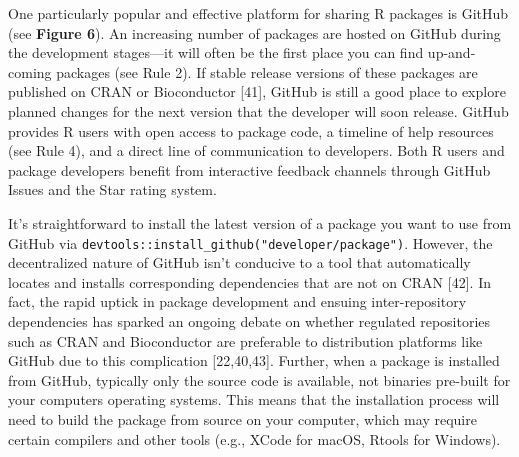 \documentclass[10pt,letterpaper]{article}
\begin{document}
One particularly popular and effective platform for sharing R packages
is GitHub (see \textbf{Figure 6}). An increasing number of packages are
hosted on GitHub during the development stages---it will often be the
first place you can find up-and-coming packages (see Rule 2). If stable
release versions of these packages are published on CRAN or Bioconductor
{[}41{]}, GitHub is still a good place to explore planned changes for
the next version that the developer will soon release. GitHub provides R
users with open access to package code, a timeline of help resources
(see Rule 4), and a direct line of communication to developers. Both R
users and package developers benefit from interactive feedback channels
through GitHub Issues and the Star rating system.

It's straightforward to install the latest version of a package you want
to use from GitHub via
\texttt{devtools::install\_github("developer/package")}. However, the
decentralized nature of GitHub isn't conducive to a tool that
automatically locates and installs corresponding dependencies that are
not on CRAN {[}42{]}. In fact, the rapid uptick in package development
and ensuing inter-repository dependencies has sparked an ongoing debate
on whether regulated repositories such as CRAN and Bioconductor are
preferable to distribution platforms like GitHub due to this
complication {[}22,40,43{]}. Further, when a package is installed from
GitHub, typically only the source code is available, not binaries
pre-built for your computers operating systems. This means that the
installation process will need to build the package from source on your
computer, which may require certain compilers and other tools (e.g.,
XCode for macOS, Rtools for Windows).
\end{document}
